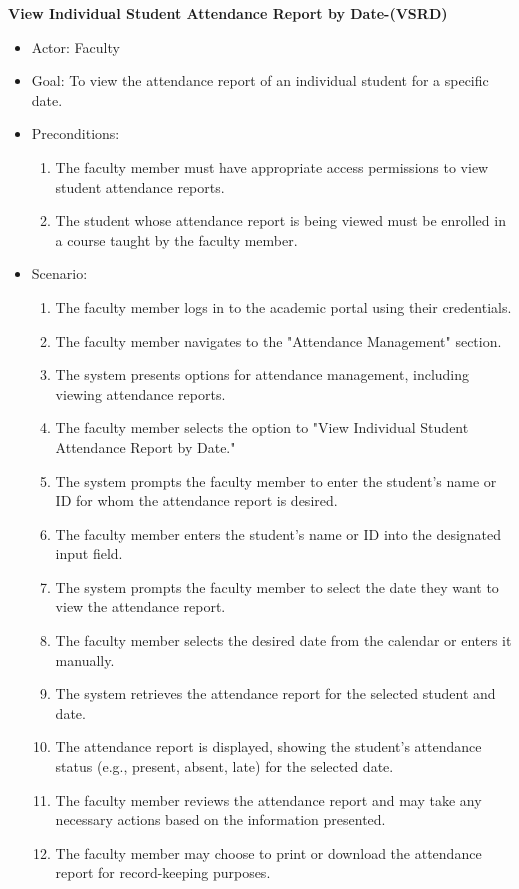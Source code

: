 \documentclass[letterpaper,12pt,oneside,listof=totoc]{scrreprt}
\begin{document}
\hfill \break
\textbf{View Individual Student Attendance Report by Date-(VSRD)}
\begin{itemize}
    \item Actor: Faculty
    \item Goal: To view the attendance report of an individual student for a specific date.
    \item Preconditions:
    \begin{enumerate}
        \item The faculty member must have appropriate access permissions to view student attendance reports.
        \item The student whose attendance report is being viewed must be enrolled in a course taught by the faculty member.
    \end{enumerate}
    \item Scenario:
    \begin{enumerate}
        \item The faculty member logs in to the academic portal using their credentials.
        \item The faculty member navigates to the "Attendance Management" section.
        \item The system presents options for attendance management, including viewing attendance reports.
        \item The faculty member selects the option to "View Individual    Student Attendance Report by Date."
        \item The system prompts the faculty member to enter the student's name or ID for whom the attendance report is desired.
        \item The faculty member enters the student's name or ID into the designated input field.
        \item The system prompts the faculty member to select the date they want to view the attendance report.
        \item The faculty member selects the desired date from the calendar or enters it manually.
        \item The system retrieves the attendance report for the selected student and date.
        \item The attendance report is displayed, showing the student's attendance status (e.g., present, absent, late) for the selected date.
        \item The faculty member reviews the attendance report and may take any necessary actions based on the information presented.
        \item The faculty member may choose to print or download the attendance report for record-keeping purposes.
    \end{enumerate}
\end{itemize}
\end{document}
